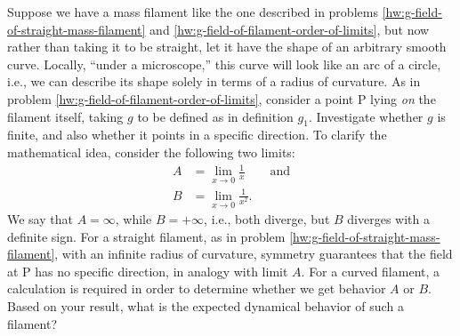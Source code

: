 Suppose we have a mass filament like the one described in problems
\ref{hw:g-field-of-straight-mass-filament} and \ref{hw:g-field-of-filament-order-of-limits}, but now rather than taking it to be
straight, let it have the shape of an arbitrary smooth curve. Locally, ``under a
microscope,'' this curve will look like an arc of a circle, i.e., we can describe its
shape solely in terms of a radius of curvature. 
As in problem \ref{hw:g-field-of-filament-order-of-limits},
consider a point P lying \emph{on} the filament itself, taking $g$ to be defined as in definition $g_1$.
Investigate whether $g$ is finite, and also whether it points in a specific direction. To clarify the
mathematical idea, consider the following two limits:
\begin{align*}
  A &=\lim_{x\rightarrow0} \frac{1}{x} \qquad \text{and}\\
  B &=\lim_{x\rightarrow0} \frac{1}{x^2}. 
\end{align*}
We say that $A=\infty$, while $B=+\infty$, i.e., both diverge, but $B$ diverges with a definite sign. 
For a straight filament,
as in problem \ref{hw:g-field-of-straight-mass-filament}, with an infinite radius of
curvature, symmetry guarantees that the field at P has no specific direction, in analogy with limit $A$.
For a curved filament, a calculation is required in order to determine whether we get behavior $A$ or $B$.
Based on your result, what is the expected dynamical behavior of such a filament?
